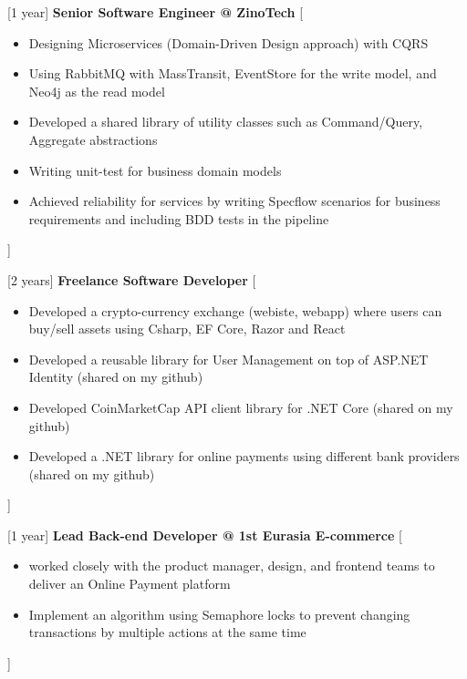 \documentclass{resume}
\begin{document}
\begin{experiences}
    {[1 year] \textbf{Senior Software Engineer @ ZinoTech} }%
    [\begin{itemize}
      \item Designing Microservices (Domain-Driven Design approach) with CQRS
      \item Using RabbitMQ with MassTransit, EventStore for the write model, and Neo4j as the read model
      \item Developed a shared library of utility classes such as Command/Query, Aggregate abstractions
      \item Writing unit-test for business domain models
      \item Achieved reliability for services by writing Specflow scenarios for business requirements and including BDD tests in the pipeline
    \end{itemize}]

  \separator{0.5ex}
    {[2 years] \textbf{Freelance Software Developer} }%
    [\begin{itemize}
      \item Developed a crypto-currency exchange (webiste, webapp) where users can buy/sell assets using Csharp, EF Core, Razor and React
      \item Developed a reusable library for User Management on top of ASP.NET Identity (shared on my github)
      \item Developed CoinMarketCap API client library for .NET Core (shared on my github) 
      \item Developed a .NET library for online payments using different bank providers (shared on my github)
    \end{itemize}]

    \separator{0.5ex}
    {[1 year] \textbf{Lead Back-end Developer @ 1st Eurasia E-commerce}}%
    [\begin{itemize}
      \item worked closely with the product manager, design, and frontend teams to deliver an Online Payment platform
       \item Implement an algorithm using Semaphore locks to prevent changing transactions by multiple actions at the same time
    \end{itemize}]
    

\end{experiences}
\end{document}
